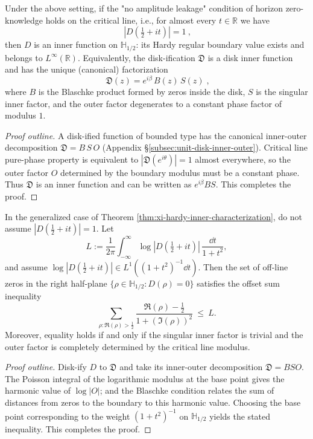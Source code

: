 \begin{theorem}\label{thm:xi-hardy-inner-characterization}
Under the above setting, if the "no amplitude leakage" condition of horizon zero-knowledge holds on the critical line, i.e., for almost every \(t\in\mathbb{R}\) we have
\[
\boxed{\ |D(\tfrac12+it)|=1\ },
\]
then \(D\) is an inner function on \(\mathbb{H}_{1/2}\): its Hardy regular boundary value exists and belongs to \(L^\infty(\mathbb{R})\).
Equivalently, the disk-ification \(\mathfrak{D}\) is a disk inner function and has the unique (canonical) factorization
\[
\boxed{\;
\mathfrak{D}(z)=e^{i\beta}\,B(z)\,S(z)\;},
\]
where \(B\) is the Blaschke product formed by zeros inside the disk, \(S\) is the singular inner factor, and the outer factor degenerates to a constant phase factor of modulus \(1\).
\end{theorem}
\begin{proof}[Proof outline]
A disk-ified function of bounded type has the canonical inner-outer decomposition \(\mathfrak{D}=B\,S\,O\) (Appendix \S\ref{subsec:unit-disk-inner-outer}).
Critical line pure-phase property is equivalent to \(|\mathfrak{D}(e^{i\theta})|=1\) almost everywhere, so the outer factor \(O\) determined by the boundary modulus must be a constant phase.
Thus \(\mathfrak{D}\) is an inner function and can be written as \(e^{i\beta}BS\). This completes the proof.
\end{proof}

\begin{proposition}\label{prop:xi-leakage-zero-offset-sum}
In the generalized case of Theorem \ref{thm:xi-hardy-inner-characterization}, do not assume \(|D(\tfrac12+it)|=1\).
Let
\[
L:=\frac{1}{2\pi}\int_{-\infty}^{\infty}\log |D(\tfrac12+it)|\,\frac{\dd t}{1+t^2},
\]
and assume \(\log|D(\tfrac12+it)|\in L^1((1+t^2)^{-1}\dd t)\).
Then the set of off-line zeros in the right half-plane \(\{\rho\in\mathbb{H}_{1/2}:D(\rho)=0\}\) satisfies the offset sum inequality
\[
\boxed{\;
\sum_{\rho:\Re(\rho)>\frac12}\frac{\Re(\rho)-\frac12}{1+(\Im(\rho))^2}\ \le\ L.\;}
\]
Moreover, equality holds if and only if the singular inner factor is trivial and the outer factor is completely determined by the critical line modulus.
\end{proposition}
\begin{proof}[Proof outline]
Disk-ify \(D\) to \(\mathfrak{D}\) and take its inner-outer decomposition \(\mathfrak{D}=BSO\).
The Poisson integral of the logarithmic modulus at the base point gives the harmonic value of \(\log|O|\); and the Blaschke condition relates the sum of distances from zeros to the boundary to this harmonic value.
Choosing the base point corresponding to the weight \((1+t^2)^{-1}\) on \(\mathbb{H}_{1/2}\) yields the stated inequality. This completes the proof.
\end{proof}

